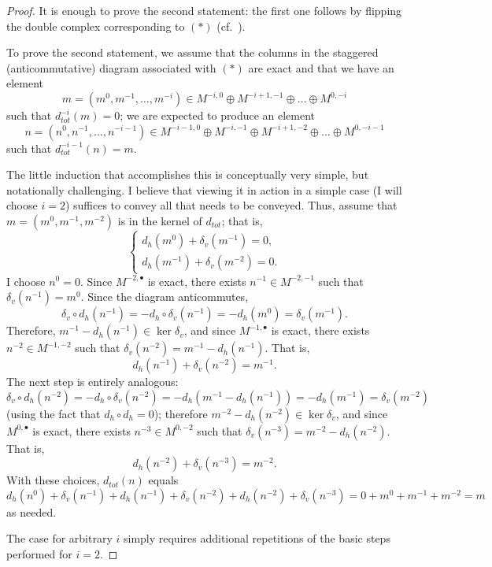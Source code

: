 \begin{proof}
  It is enough to prove the second statement: the first one follows by
  flipping the double complex corresponding to $(*)$ (cf.\
  ).

  To prove the second statement, we assume that the columns in the
  staggered (anticommutative) diagram
  associated with $(*)$ are exact and that we have an element
  \[
    m = (m^0, m^{-1}, \dots, m^{-i}) \in M^{-i,0} \oplus M^{-i+1,-1}
    \oplus \dots \oplus M^{0,-i}
  \]
  such that $d_{tot}^{-i}(m) = 0$; we are expected to produce an
  element
  \[
    n = (n^0, n^{-1}, \dots, n^{-i-1}) \in M^{-i-1,0} \oplus M^{-i,-1}
    \oplus M^{-i+1,-2} \oplus \dots \oplus M^{0,-i-1}
  \]
  such that $d_{tot}^{-i-1}(n) = m$.

  The little induction that accomplishes this is conceptually very
  simple, but notationally challenging. I believe that viewing it in
  action in a simple case (I will choose $i = 2$) suffices to convey
  all that needs to be conveyed. Thus, assume that
  $m = (m^0, m^{-1}, m^{-2})$ is in the kernel of $d_{tot}$; that is,
  \[
    \begin{cases}
      d_h(m^0) + \delta_v(m^{-1}) = 0, \\
      d_h(m^{-1}) + \delta_v(m^{-2}) = 0.
    \end{cases}
  \]
  I choose $n^0 = 0$. Since $M^{-2,\bullet}$ is exact, there exists
  $n^{-1} \in M^{-2,-1}$ such that $\delta_v(n^{-1}) = m^0$. Since the
  diagram anticommutes,
  \[
    \delta_v \circ d_h(n^{-1}) = -d_h \circ \delta_v(n^{-1}) =
    -d_h(m^0) = \delta_v(m^{-1}).
  \]
  Therefore, $m^{-1} - d_h(n^{-1}) \in \ker \delta_v$, and since
  $M^{-1,\bullet}$ is exact, there exists $n^{-2} \in M^{-1,-2}$ such
  that $\delta_v(n^{-2}) = m^{-1} - d_h(n^{-1})$. That is,
  \[
    d_h(n^{-1}) + \delta_v(n^{-2}) = m^{-1}.
  \]
  The next step is entirely analogous:
  \[
    \delta_v \circ d_h(n^{-2}) = -d_h \circ \delta_v(n^{-2}) =
    -d_h(m^{-1} - d_h(n^{-1})) = -d_h(m^{-1}) = \delta_v(m^{-2})
  \]
  (using the fact that $d_h \circ d_h = 0$); therefore
  $m^{-2} - d_h(n^{-2}) \in \ker \delta_v$, and since $M^{0,\bullet}$
  is exact, there exists $n^{-3} \in M^{0,-2}$ such that
  $\delta_v(n^{-3}) = m^{-2} - d_h(n^{-2})$. That is,
  \[
    d_h(n^{-2}) + \delta_v(n^{-3}) = m^{-2}.
  \]
  With these choices, $d_{tot}(n)$ equals
  \[
    d_h(n^0) + \delta_v(n^{-1}) + d_h(n^{-1}) + \delta_v(n^{-2}) +
    d_h(n^{-2}) + \delta_v(n^{-3}) = 0 + m^0 + m^{-1} + m^{-2} = m
  \]
  as needed.

  The case for arbitrary $i$ simply requires additional repetitions of
  the basic steps performed for $i = 2$.
\end{proof}

